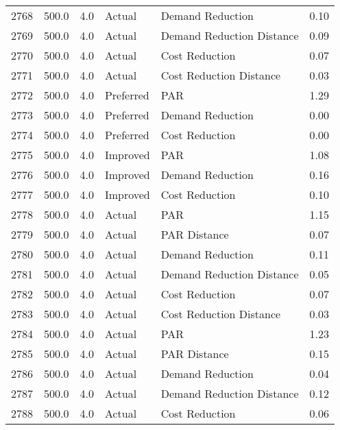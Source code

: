 \begin{longtable}{lrrllr}
2768 &        500.0 &     4.0 &         Actual &           Demand Reduction &   0.10 \\
2769 &        500.0 &     4.0 &         Actual &  Demand Reduction Distance &   0.09 \\
2770 &        500.0 &     4.0 &         Actual &             Cost Reduction &   0.07 \\
2771 &        500.0 &     4.0 &         Actual &    Cost Reduction Distance &   0.03 \\
2772 &        500.0 &     4.0 &      Preferred &                        PAR &   1.29 \\
2773 &        500.0 &     4.0 &      Preferred &           Demand Reduction &   0.00 \\
2774 &        500.0 &     4.0 &      Preferred &             Cost Reduction &   0.00 \\
2775 &        500.0 &     4.0 &       Improved &                        PAR &   1.08 \\
2776 &        500.0 &     4.0 &       Improved &           Demand Reduction &   0.16 \\
2777 &        500.0 &     4.0 &       Improved &             Cost Reduction &   0.10 \\
2778 &        500.0 &     4.0 &         Actual &                        PAR &   1.15 \\
2779 &        500.0 &     4.0 &         Actual &               PAR Distance &   0.07 \\
2780 &        500.0 &     4.0 &         Actual &           Demand Reduction &   0.11 \\
2781 &        500.0 &     4.0 &         Actual &  Demand Reduction Distance &   0.05 \\
2782 &        500.0 &     4.0 &         Actual &             Cost Reduction &   0.07 \\
2783 &        500.0 &     4.0 &         Actual &    Cost Reduction Distance &   0.03 \\
2784 &        500.0 &     4.0 &         Actual &                        PAR &   1.23 \\
2785 &        500.0 &     4.0 &         Actual &               PAR Distance &   0.15 \\
2786 &        500.0 &     4.0 &         Actual &           Demand Reduction &   0.04 \\
2787 &        500.0 &     4.0 &         Actual &  Demand Reduction Distance &   0.12 \\
2788 &        500.0 &     4.0 &         Actual &             Cost Reduction &   0.06 \\

\end{longtable}
